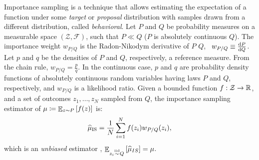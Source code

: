 Importance sampling \cite{cochran2007sampling,mcbook} is a technique that allows estimating the expectation of a function under some \textit{target} or \textit{proposal} distribution with samples drawn from a different distribution, called \textit{behavioral}.   Let $P$ and $Q$ be probability measures on a measurable space $(\mathcal{Z}, \mathcal{F})$, such that $P\ll Q$ (\ie $P$ is absolutely continuous \wrt $Q$). The importance weight $w_{P/Q}$ is the Radon-Nikodym derivative of $P$ \wrt $Q$, \ie~$w_{P/Q} \equiv \frac{\mathrm{d} P}{\mathrm{d} Q}$. Let $p$ and $q$ be the densities of $P$ and $Q$, respectively, \wrt a reference measure. From the chain rule, $w_{P/Q} = \frac{p}{q}$. In the continuous case, $p$ and $q$ are probability density functions of absolutely continuous random variables having laws $P$ and $Q$, respectively, and $w_{P/Q}$ is a likelihood ratio. 
Given a bounded function $f:\mathcal{Z}\to\mathbb{R}$, and a set of \iid outcomes $z_1,\dots,z_N$ sampled from $Q$, the importance sampling estimator of $\mu\coloneqq\mathop{\mathbb{E}}_{z\sim P}\left[f(z)\right]$ is:
\begin{align}\label{eq:ise}
	\widehat{\mu}_{\text{IS}} = \frac{1}{N}\sum_{i=1}^{N}f(z_i)w_{P/Q}(z_i),
\end{align}
which is an \emph{unbiased} estimator \cite{mcbook}, \ie ${\mathop{\mathbb{E}}_{z_i\stackrel{\text{iid}}{\sim} Q}\left[\widehat{\mu}_{IS}\right] = \mu}$. 

